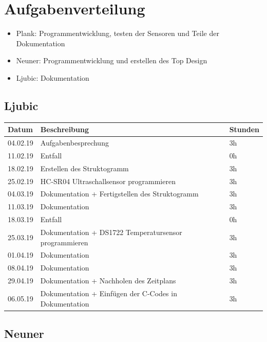 \documentclass[12pt,a4paper,german]{article}
\begin{document}
\section{Aufgabenverteilung}
\begin{itemize}
	\item{Plank: Programmentwicklung, testen der Sensoren und Teile der 
		Dokumentation}

	\item{Neuner: Programmentwicklung und erstellen des Top Design}

	\item{Ljubic: Dokumentation}
\end{itemize}

\subsection{Ljubic}

\begin{table}[H]
\centering 
\begin{tabularx}{\textwidth}{|l|X|l|}
\hline
\textbf{Datum} & \textbf{Beschreibung} & \textbf{Stunden} \\ 
\hline
\hline
04.02.19 & Aufgabenbesprechung & 3h \\ 
\hline
11.02.19 & Entfall & 0h \\ 
\hline
18.02.19 & Erstellen des Struktogramm  & 3h \\ 
\hline
25.02.19 & HC-SR04 Ultraschallsensor programmieren & 3h \\ 
\hline
04.03.19 & Dokumentation + Fertigstellen des Struktogramm & 3h \\ 
\hline
11.03.19 & Dokumentation & 3h \\ 
\hline
18.03.19 & Entfall & 0h\\ 
\hline
25.03.19 & Dokumentation + DS1722 Temperatursensor programmieren & 3h \\ 
\hline
01.04.19 & Dokumentation & 3h \\ 
\hline
08.04.19 & Dokumentation & 3h \\ 
\hline
29.04.19 & Dokumentation + Nachholen des Zeitplans & 3h \\ 
\hline
06.05.19 & Dokumentation + Einfügen der C-Codes in Dokumentation  & 3h \\ 
\hline
\hline
\end{tabularx}
\end{table}

\subsection{Neuner}
\end{document}
